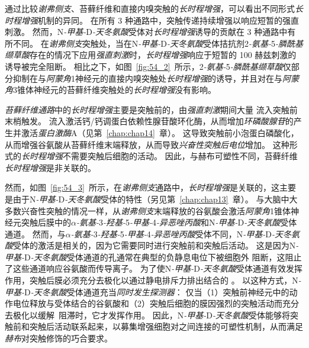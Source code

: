 通过比较\textit{谢弗侧支}、苔藓纤维和直接内嗅突触的\textit{长时程增强}，可以看出不同形式\textit{长时程增强}机制的异同。
在所有 3 种通路中，突触传递持续增强以响应短暂的强直刺激。
然而，N\textit{-甲基-}D\textit{-天冬氨酸}受体对\textit{长时程增强}诱导的贡献在 3 种通路中有所不同。
在\textit{谢弗侧支}突触处，当在N\textit{-甲基-}D\textit{-天冬氨酸}受体拮抗剂2\textit{-氨基-}5\textit{-膦酰基缬草酸}存在的情况下应用\textit{强直刺激}时，\textit{长时程增强}响应于短暂的 100 赫兹刺激的诱导被完全阻断。
相比之下，如图~\ref{fig:54_2}~所示，2\textit{-氨基-}5\textit{-膦酰基缬草酸}仅部分抑制在与\textit{阿蒙角}1神经元的直接内嗅突触处\textit{长时程增强}的诱导，并且对在与\textit{阿蒙角}3锥体神经元的苔藓纤维突触处的\textit{长时程增强}没有影响。


\textit{苔藓纤维通路}中的\textit{长时程增强}主要是突触前的，由\textit{强直刺激}期间大量  流入突触前末梢触发。
 流入激活钙/钙调蛋白依赖性腺苷酸环化酶，从而增加\textit{环磷酸腺苷}的产生并激活\textit{蛋白激酶}A（见第~\ref{chap:chap14}~章）。
这导致突触前小泡蛋白磷酸化，从而增强谷氨酸从苔藓纤维末端释放，从而导致\textit{兴奋性突触后电位}增加。
这种形式的\textit{长时程增强}不需要突触后细胞的活动。
因此，与赫布可塑性不同，苔藓纤维\textit{长时程增强}是非关联的。


然而，如图~\ref{fig:54_3}~所示，在\textit{谢弗侧支}通路中，\textit{长时程增强}是关联的，这主要是由于N\textit{-甲基-}D\textit{-天冬氨酸}受体的特性（另见第~\ref{chap:chap13}~章）。
与大脑中大多数兴奋性突触的情况一样，从\textit{谢弗侧支}末端释放的谷氨酸会激活\textit{阿蒙角}1锥体神经元突触后膜中的\textit{$\alpha$-氨基-}3\textit{-羟基-}5\textit{-甲基-}4\textit{-异恶唑丙酸}和N\textit{-甲基-}D\textit{-天冬氨酸}受体通道。
然而，与\textit{$\alpha$-氨基-}3\textit{-羟基-}5\textit{-甲基-}4\textit{-异恶唑丙酸}受体不同，N\textit{-甲基-}D\textit{-天冬氨酸}受体的激活是相关的，因为它需要同时进行突触前和突触后活动。
这是因为N\textit{-甲基-}D\textit{-天冬氨酸}受体通道的孔通常在典型的负静息电位下被细胞外  阻断，这阻止了这些通道响应谷氨酸而传导离子。
为了使N\textit{-甲基-}D\textit{-天冬氨酸}受体通道有效发挥作用，突触后膜必须充分去极化以通过静电排斥力排出结合的 。
以这种方式，N\textit{-甲基-}D\textit{-天冬氨酸}受体通道充当\textit{同时发生探测器}：
仅当（1）突触前神经元中的动作电位释放与受体结合的谷氨酸和（2）突触后细胞的膜因强烈的突触活动而充分去极化以缓解~阻滞时，它才发挥作用。
因此，N\textit{-甲基-}D\textit{-天冬氨酸}受体能够将突触前和突触后活动联系起来，以募集增强细胞对之间连接的可塑性机制，从而满足\textit{赫布}对突触修饰的巧合要求。


